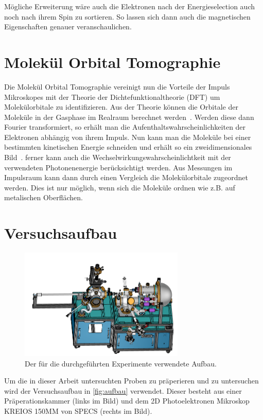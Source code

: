             Mögliche Erweiterung wäre auch die Elektronen nach der Energieselection auch noch nach ihrem Spin zu sortieren.
            So lassen sich dann auch die magnetischen Eigenschaften genauer veranschaulichen.
        

    \section{Molekül Orbital Tomographie} \label{sec:MOT}
        Die Molekül Orbital Tomographie vereinigt nun die Vorteile der Impuls Mikroskopes mit der Theorie der Dichtefunktionaltheorie (DFT) um Molekülorbitale zu identifizieren.
        Aus der Theorie können die Orbitale der Moleküle in der Gasphase im Realraum berechnet werden~\cite{database}.
        Werden diese dann Fourier transformiert, so erhält man die Aufenthaltswahrscheinlichkeiten der Elektronen abhängig von ihrem Impuls.
        Nun kann man die Moleküle bei einer bestimmten kinetischen Energie schneiden und erhält so ein zweidimensionales Bild~\cite{brandstetter_kmappy_2021}.
        ferner kann auch die Wechselwirkungswahrscheinlichtkeit mit der verwendeten Photonenenergie berücksichtigt werden.
        Aus Messungen im Impulsraum kann dann durch einen Vergleich die Molekülorbitale zugeordnet werden.
        Dies ist nur möglich, wenn sich die Moleküle ordnen wie z.B. auf metalischen Oberflächen.

    \section{Versuchsaufbau}
        \begin{figure}
            \centering
            \includegraphics[width=0.7\textwidth]{./content/MM.png}
            \caption{Der für die durchgeführten Experimente verwendete Aufbau.}
            \label{fig:aufbau}
        \end{figure}
        Um die in dieser Arbeit untersuchten Proben zu präperieren und zu untersuchen wird der Versuchsaufbau in \autoref{fig:aufbau} verwendet.
        Dieser besteht aus einer Präperationskammer (links im Bild) und dem 2D Photoelektronen Mikroskop KREIOS 150MM von SPECS (rechts im Bild).

